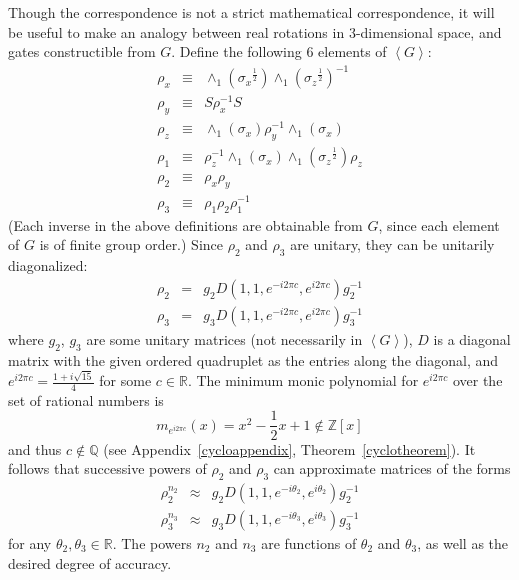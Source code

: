\documentclass[twocolumn,11pt]{article}
\newcommand{\sqrtsz}{{\sigma_z}^{\frac{1}{2}}}
\newcommand{\sqrtsx}{{\sigma_x}^{\frac{1}{2}}}
\begin{document}
Though the correspondence is not a strict mathematical correspondence,
it will be useful to make an analogy between real rotations in
3-dimensional space, and gates constructible from $G$.  Define the
following 6 elements of $\left<G\right>$:
\begin{eqnarray*}
\rho_x & \equiv & \wedge_1\!(\sqrtsx)
   \wedge_1\!(\sqrtsz)^{-1} \\
\rho_y & \equiv & S\rho_x^{-1}S \\
\rho_z & \equiv & \wedge_1\!(\sigma_x)
   \rho_y^{-1}\wedge_1\!(\sigma_x) \\
\rho_1 & \equiv & \rho_z^{-1}\wedge_1(\sigma_x)
   \wedge_1(\sqrtsz)\rho_z \\
\rho_2 & \equiv & \rho_x\rho_y \\
\rho_3 & \equiv & \rho_1\rho_2\rho_1^{-1}
\end{eqnarray*}
(Each inverse in the above definitions are obtainable from $G$, since each
element of $G$ is of finite group order.)  Since $\rho_2$ and $\rho_3$
are unitary, they can be unitarily diagonalized:
\begin{eqnarray*}
\rho_2 &=& g_2D(1,1,e^{-i2\pi c},e^{i2\pi c})g_2^{-1} \\
\rho_3 &=& g_3D(1,1,e^{-i2\pi c},e^{i2\pi c})g_3^{-1}
\end{eqnarray*}
where $g_2$, $g_3$ are some unitary matrices (not necessarily
in $\left<G\right>$), $D$ is a diagonal matrix with the given
ordered quadruplet as the entries along the diagonal, and $e^{i2\pi
c}=\frac{1+i\sqrt{15}}{4}$ for some $c\in\mathbb R$.  The minimum monic
polynomial for $e^{i2\pi c}$ over the set of rational numbers is
\[ m_{e^{i2\pi c}}(x) = x^2 - \frac{1}{2}x + 1 \not\in \mathbb Z[x] \]
and thus $c\not\in\mathbb Q$ (see Appendix~\ref{cycloappendix},
Theorem~\ref{cyclotheorem}).  It follows that successive powers of
$\rho_2$ and $\rho_3$ can approximate matrices of the forms
\begin{eqnarray}
\rho_2^{n_2} &\approx&
g_2D(1,1,e^{-i\theta_2},e^{i\theta_2})g_2^{-1}\label{diagtheta2} \\
\rho_3^{n_3} &\approx&
g_3D(1,1,e^{-i\theta_3},e^{i\theta_3})g_3^{-1}\label{diagtheta3}
\end{eqnarray}
for any $\theta_2,\theta_3\in\mathbb R$.  The powers $n_2$ and $n_3$
are functions of $\theta_2$ and $\theta_3$, as well as the desired degree
of accuracy.
\end{document}
